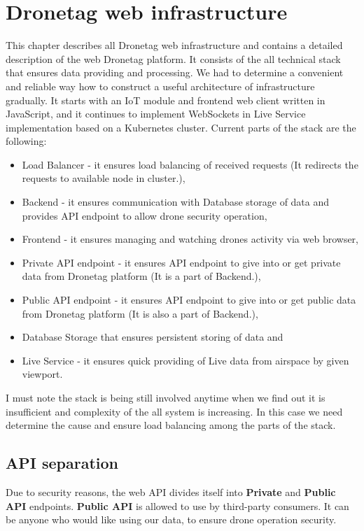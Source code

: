 \chapter{Dronetag web infrastructure}\label{ch:dronetag-web-infrastructure}
This chapter describes all Dronetag web infrastructure and contains a detailed description of the web Dronetag platform.
It consists of the all technical stack that ensures data providing and processing.
We had to determine a convenient and reliable way how to construct a useful architecture of infrastructure gradually.
It starts with an IoT module and frontend web client written in JavaScript, and it continues to implement WebSockets in Live Service implementation based on a Kubernetes cluster.
Current parts of the stack are the following:
\begin{itemize}
    \item Load Balancer - it ensures load balancing of received requests (It redirects the requests to available node in cluster.),
    \item Backend - it ensures communication with Database storage of data and provides API endpoint to allow drone security operation,
    \item Frontend - it ensures managing and watching drones activity via web browser,
    \item Private API endpoint - it ensures API endpoint to give into or get private data from Dronetag platform (It is a part of Backend.),
    \item Public API endpoint - it ensures API endpoint to give into or get public data from Dronetag platform (It is also a part of Backend.),
    \item Database Storage that ensures persistent storing of data and
    \item Live Service - it ensures quick providing of Live data from airspace by given viewport.
\end{itemize}
I must note the stack is being still involved anytime when we find out it is insufficient and complexity of the all system is increasing.
In this case we need determine the cause and ensure load balancing among the parts of the stack.

\section{API separation}\label{sec:api-separation}
Due to security reasons, the web API divides itself into \textbf{Private} and \textbf{Public API} endpoints.
\textbf{Public API} is allowed to use by third-party consumers.
It can be anyone who would like using our data, to ensure drone operation security.

